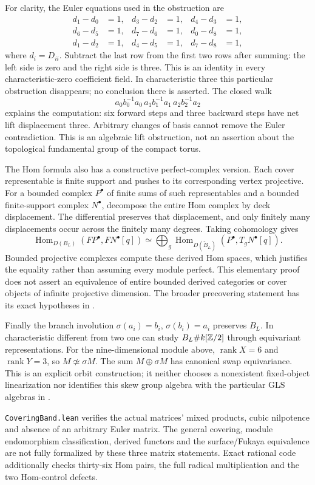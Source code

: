For clarity, the Euler equations used in the obstruction are
\begin{align*}
 d_1-d_0&=1,&d_3-d_2&=1,&d_4-d_3&=1,\\
 d_6-d_5&=1,&d_7-d_6&=1,&d_0-d_8&=1,\\
 d_1-d_2&=1,&d_4-d_5&=1,&d_7-d_8&=1,
\end{align*}
where $d_i=D_{ii}$. Subtract the last row from the first two rows after
summing: the left side is zero and the right side is three. This is an
identity in every characteristic-zero coefficient field. In characteristic
three this particular obstruction disappears; no conclusion there is
asserted. The closed walk
\[
 a_0b_0^{-1}a_0\,a_1b_1^{-1}a_1\,a_2b_2^{-1}a_2
\]
explains the computation: six forward steps and three backward steps have
net lift displacement three. Arbitrary changes of basis cannot remove the
Euler contradiction. This is an algebraic lift obstruction, not an
assertion about the topological fundamental group of the compact torus.

The Hom formula also has a constructive perfect-complex version. Each
cover representable is finite support and pushes to its corresponding
vertex projective. For a bounded complex $P^\bullet$ of finite sums of such
representables and a bounded finite-support complex $N^\bullet$, decompose
the entire Hom complex by deck displacement. The differential preserves
that displacement, and only finitely many displacements occur across the
finitely many degrees. Taking cohomology gives
\[
 \operatorname{Hom}_{D(B_L)}(FP^\bullet,FN^\bullet[q])
 \simeq\bigoplus_g
 \operatorname{Hom}_{D(\widetilde B_L)}(P^\bullet,T_gN^\bullet[q]).
\]
Bounded projective complexes compute these derived Hom spaces, which
justifies the equality rather than assuming every module perfect. This
elementary proof does not assert an equivalence of entire bounded derived
categories or cover objects of infinite projective dimension. The broader
precovering statement has its exact hypotheses in
\cite[Theorem~4.28]{CoveringLecture2026}.

Finally the branch involution $\sigma(a_i)=b_i$, $\sigma(b_i)=a_i$
preserves $B_L$. In characteristic different from two one can study
$B_L\#k[\mathbb Z/2]$ through equivariant representations. For the nine-dimensional
module above, $\operatorname{rank}X=6$ and $\operatorname{rank}Y=3$, so
$M\not\simeq\sigma M$. The sum $M\oplus\sigma M$ has canonical swap
equivariance. This is an explicit orbit construction; it neither chooses a
nonexistent fixed-object linearization nor identifies this skew group
algebra with the particular GLS algebras in \cite{TameGLS2026}.

\texttt{CoveringBand.lean} verifies the actual matrices' mixed products,
cubic nilpotence and absence of an arbitrary Euler matrix. The general
covering, module endomorphism classification, derived functors and the
surface/Fukaya equivalence are not fully formalized by these three matrix
statements. Exact rational code additionally checks thirty-six Hom pairs,
the full radical multiplication and the two Hom-control defects.

